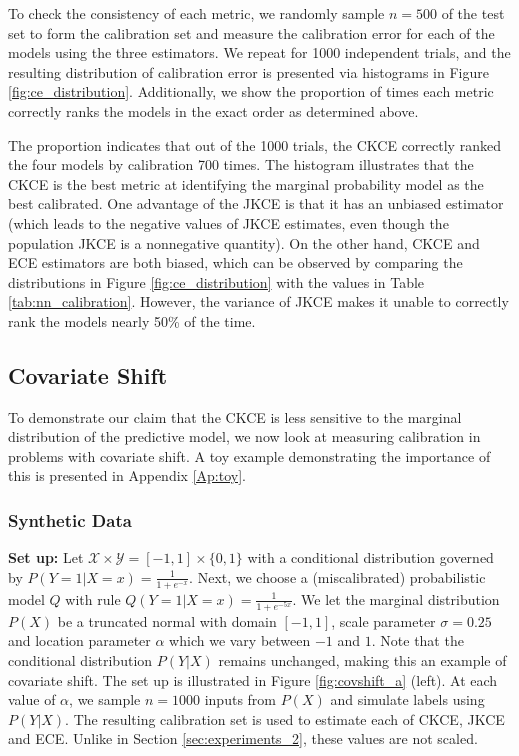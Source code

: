 \documentclass[twocolumn]{article}
\theoremstyle{definition}
\begin{document}
To check the consistency of each metric, we randomly sample $n=500$ of the test set to form the calibration set and measure the calibration error for each of the models using the three estimators. We repeat for 1000 independent trials, and the resulting distribution of calibration error is presented via histograms in Figure \ref{fig:ce_distribution}. Additionally, we show the proportion of times each metric correctly ranks the models in the exact order as determined above. 

The proportion indicates that out of the 1000 trials, the CKCE correctly ranked the four models by calibration 700 times. The histogram illustrates that the CKCE is the best metric at identifying the marginal probability model as the best calibrated. One advantage of the JKCE is that it has an unbiased estimator (which leads to the negative values of JKCE estimates, even though the population JKCE is a nonnegative quantity). On the other hand, CKCE and ECE estimators are both biased, which can be observed by comparing the distributions in Figure \ref{fig:ce_distribution} with the values in Table \ref{tab:nn_calibration}. However, the variance of JKCE makes it unable to correctly rank the models nearly 50\% of the time.  



\subsection{Covariate Shift}

To demonstrate our claim that the CKCE is less sensitive to the marginal distribution of the predictive model, we now look at measuring calibration in problems with covariate shift. A toy example demonstrating the importance of this is presented in Appendix \ref{Ap:toy}. 

\subsubsection{Synthetic Data}

\textbf{Set up:} Let $\mathcal{X}\times \mathcal{Y} = [-1, 1] \times \{0,1\}$ with a conditional distribution governed by $P(Y=1|X=x) = \frac{1}{1+e^{-x}}$. Next, we choose a (miscalibrated) probabilistic model $Q$ with rule $Q(Y=1|X=x) = \frac{1}{1+e^{-5x}}$. We let the marginal distribution $P(X)$ be a truncated normal with domain $[-1,1]$, scale parameter $\sigma = 0.25$ and location parameter $\alpha$ which we vary between $-1$ and $1$. Note that the conditional distribution $P(Y|X)$ remains unchanged, making this an example of covariate shift. The set up is illustrated in Figure \ref{fig:covshift_a} (left). At each value of $\alpha$, we sample $n=1000$ inputs from $P(X)$ and simulate labels using $P(Y|X)$. The resulting calibration set is used to estimate each of CKCE, JKCE and ECE. Unlike in Section \ref{sec:experiments_2}, these values are not scaled.
\end{document}

